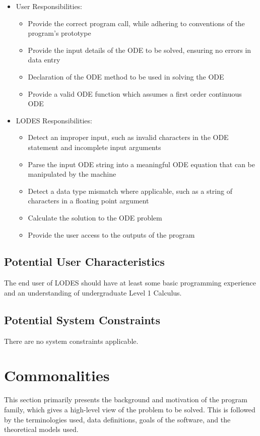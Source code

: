 \documentclass[12pt]{article}
\newcommand{\famname}{LODES} %
\begin{document}
\begin{itemize}
\item User Responsibilities:
\begin{itemize}
\item Provide the correct program call, while adhering to conventions of the program's prototype
\item Provide the input details of the ODE to be solved, ensuring no errors in data entry
\item Declaration of the ODE method to be used in solving the ODE
\item Provide a valid ODE function which assumes a first order continuous ODE
\end{itemize}
\item \famname{} Responsibilities:
\begin{itemize}
\item Detect an improper input, such as invalid characters in the ODE statement and incomplete input arguments
\item Parse the input ODE string into a meaningful ODE equation that can be manipulated by the machine
\item Detect a data type mismatch where applicable, such as a string of characters in a floating point argument
\item Calculate the solution to the ODE problem
\item Provide the user access to the outputs of the program
\end{itemize}
\end{itemize}

\subsection{Potential User Characteristics} \label{SecUserCharacteristics}

The end user of \famname{} should have at least some basic programming experience and
an understanding of undergraduate Level 1 Calculus.

\subsection{Potential System Constraints}

There are no system constraints applicable.

\section{Commonalities}
This section primarily presents the background and motivation of the program family, which gives a
high-level view of the problem to be solved.  This is followed by the terminologies used, data
definitions, goals of the software, and the theoretical models used. 
\end{document}
